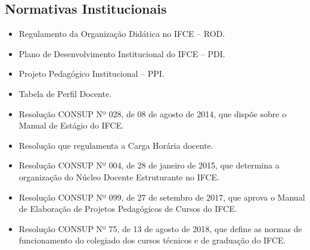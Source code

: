 \subsection{Normativas Institucionais}

\begin{itemize}
	\item Regulamento da Organização Didática no IFCE – ROD. 
	\item Plano de Desenvolvimento Institucional do IFCE – PDI. 
	\item Projeto Pedagógico Institucional – PPI. 
	\item Tabela de Perfil Docente. 
	\item Resolução CONSUP Nº 028, de 08 de agosto de 2014, que dispõe sobre o Manual de Estágio do IFCE. 
	\item Resolução que regulamenta a Carga Horária docente. 
	\item Resolução CONSUP Nº 004, de 28 de janeiro de 2015, que determina a organização do Núcleo Docente Estruturante no IFCE. 
	\item Resolução CONSUP Nº 099, de 27 de setembro de 2017, que aprova o Manual de Elaboração de Projetos Pedagógicos de Cursos do IFCE.
	\item Resolução CONSUP Nº 75, de 13 de agosto de 2018, que define as normas de funcionamento do colegiado dos cursos técnicos e de graduação do IFCE.
\end{itemize}
